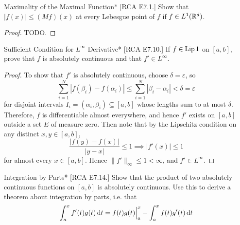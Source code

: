\begin{problem}{Maximality of the Maximal Function}*
    [RCA E7.1.] Show that \(|f(x)| \leq (Mf)(x)\) at every Lebesgue point of \(f\) if \(f \in L^1(\mathbb{R}^d)\). 
\end{problem}

\begin{proof}
    TODO. 
\end{proof}



\begin{problem}{Sufficient Condition for \(L^\infty\) Derivative}*
    [RCA E7.10.] If \(f \in \operatorname{Lip}{1}\) on \([a, b]\), prove that \(f\) is absolutely continuous and that \(f' \in L^\infty\). 
\end{problem}

\begin{proof}
    To show that \(f'\) is absolutely continuous, choose \(\delta = \varepsilon\), so
    \[
        \sum_{i=1}^N |f(\beta_i) - f(\alpha_i)| \leq \sum_{i=1}^N |\beta_i - \alpha_i| < \delta = \varepsilon
    \]
    for disjoint intervals \(I_i = (\alpha_i, \beta_i) \subseteq [a, b]\) whose lengths sum to at most \(\delta\). Therefore, \(f\) is differentiable almost everywhere, and hence \(f'\) exists on \([a, b]\) outside a set \(E\) of measure zero. Then note that by the Lipschitz condition on any distinct \(x, y \in [a, b]\), 
    \[
        \frac{|f(y) - f(x)|}{|y - x|} \leq 1 
        \implies |f'(x)| \leq 1
    \]
    for almost every \(x \in [a, b]\). Hence \(\|f'\|_\infty \leq 1 < \infty\), and \(f' \in L^\infty\). 
\end{proof}


\begin{problem}{Integration by Parts}*
    [RCA E7.14.] Show that the product of two absolutely continuous functions on \([a, b]\) is absolutely continuous. Use this to derive a theorem about integration by parts, i.e. that 
    \[
        \int_a^x f'(t) g(t) \, \mathrm{d}t = f(t) g(t) \Big\rvert_a^x - \int_a^x f(t) g'(t) \, \mathrm{d}t
    \]
\end{problem}

